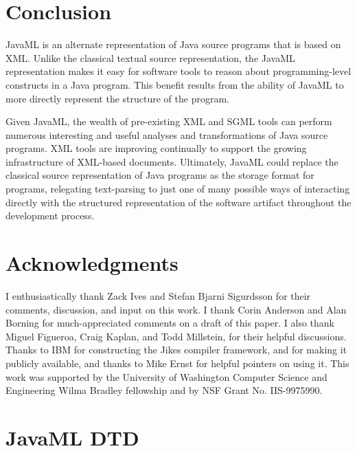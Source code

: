 \documentclass{article}
\begin{document}
\section{Conclusion}
\label{sec-conclusion}

JavaML is an alternate representation of Java source programs that is
based on XML.  Unlike the classical textual source representation, the
JavaML representation makes it easy for software tools to reason about
programming-level constructs in a Java program.  This benefit results from the
ability of JavaML to more directly represent the structure of the program.

Given JavaML, the wealth of pre-existing XML and SGML tools can perform
numerous interesting and useful analyses and transformations of Java
source programs.  XML tools are improving
continually to support the growing infrastructure of XML-based
documents.  Ultimately, JavaML could replace the classical source
representation of Java programs as the storage format for programs,
relegating text-parsing to just one of
many possible ways of interacting directly with the structured
representation of the software artifact throughout the development
process.

\section*{Acknowledgments}
\label{sec-ack}

I enthusiastically thank Zack Ives and Stefan Bjarni Sigurdsson for
their comments, discussion, and input on this work.  I thank Corin Anderson
and Alan Borning for much-appreciated comments on a draft of this paper.
I also thank Miguel Figueroa, Craig Kaplan, and Todd Millstein, for their helpful
discussions. Thanks to IBM for constructing the Jikes compiler
framework, and for making it publicly available, and thanks to Mike
Ernst for helpful pointers on using it. This work was supported by the
University of Washington Computer Science and Engineering Wilma Bradley
fellowship and by NSF Grant No. IIS-9975990.

\appendix
\section{JavaML DTD}
\label{app-javaml-dtd}
\end{document}
